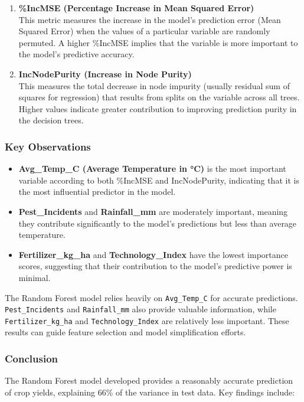 \begin{enumerate}[label=\textbf{\arabic*.}]
    \item \textbf{\%IncMSE (Percentage Increase in Mean Squared Error)}\\
    This metric measures the increase in the model's prediction error (Mean Squared Error) when the values of a particular variable are randomly permuted. A higher \%IncMSE implies that the variable is more important to the model's predictive accuracy.

    \item \textbf{IncNodePurity (Increase in Node Purity)}\\
    This measures the total decrease in node impurity (usually residual sum of squares for regression) that results from splits on the variable across all trees. Higher values indicate greater contribution to improving prediction purity in the decision trees.
\end{enumerate}

\subsubsection*{Key Observations}
\begin{itemize}
    \item \textbf{Avg\_Temp\_C (Average Temperature in °C)} is the most important variable according to both \%IncMSE and IncNodePurity, indicating that it is the most influential predictor in the model.
    
    \item \textbf{Pest\_Incidents} and \textbf{Rainfall\_mm} are moderately important, meaning they contribute significantly to the model's predictions but less than average temperature.
    
    \item \textbf{Fertilizer\_kg\_ha} and \textbf{Technology\_Index} have the lowest importance scores, suggesting that their contribution to the model's predictive power is minimal.
\end{itemize}

\newline
The Random Forest model relies heavily on \texttt{Avg\_Temp\_C} for accurate predictions. \texttt{Pest\_Incidents} and \texttt{Rainfall\_mm} also provide valuable information, while \texttt{Fertilizer\_kg\_ha} and \texttt{Technology\_Index} are relatively less important. These results can guide feature selection and model simplification efforts.


\subsubsection{Conclusion}
The Random Forest model developed provides a reasonably accurate prediction of crop yields, explaining 66\% of the variance in test data. Key findings include:

